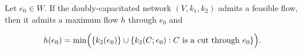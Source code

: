 Let $e_0 \in W$. If the doubly-capacitated network $(V, k_1, k_2)$ admits a feasible flow, then it admits a maximum flow $h$ through $e_0$ and

$$h(e_0) = \min\Bigl(\{k_2(e_0)\} \cup \{k_2(C; e_0): C \text{ is a cut through } e_0\}\Bigr).$$
